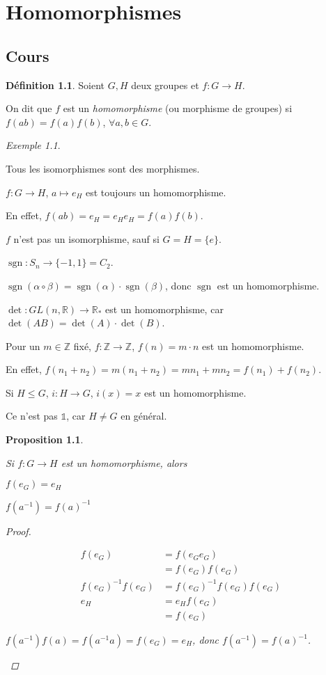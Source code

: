 \documentclass{report}
\newcounter{cours}
\newcommand*{\cours}{\section*{Cours \thecours}\stepcounter{cours}}
\newcommand*{\lte}{\leqslant}
\newcommand*{\reels}{\mathbb{R}}
\newcommand*{\entiers}{\mathbb{Z}}
\newcommand*{\identite}{\mathds{1}}
\newcommand*{\signe}{\operatorname{sgn}}
\newtheorem*{prop}{Proposition}
\theoremstyle{definition}
\newtheorem*{defin}{D\'efinition}
\theoremstyle{remark}
\newtheorem*{exem}{Exemple}
\begin{document}
	\chapter{Homomorphismes}
	\cours
	\begin{defin}
		Soient $G,H$ deux groupes et $f:G \to H$.

		On dit que $f$ est un \emph{homomorphisme} (ou morphisme de groupes) si $f(ab) = f(a)f(b)$, $\forall a,b \in G$.
	\end{defin}
	\begin{exem}~

		\begin{nlist}
			\item Tous les isomorphismes sont des morphismes.
			\item $f:G \to H$, $a \mapsto e_H$ est toujours un homomorphisme.

			En effet, $f(ab) = e_H = e_H e_H = f(a) f(b)$.

			$f$ n'est pas un isomorphisme, sauf si $G=H=\{e\}$.
			\item $\signe:S_n \to \{-1,1\} = C_2$.

			$\signe(\alpha \circ \beta) = \signe(\alpha) \cdot \signe(\beta)$, donc $\signe$ est un homomorphisme.
			\item $\det:GL(n, \reels) \to \reels_*$ est un homomorphisme, car $\det(AB) = \det(A) \cdot \det(B)$.
			\item Pour un $m \in \entiers$ fix\'e, $f:\entiers \to \entiers$, $f(n) = m \cdot n$ est un homomorphisme.

			En effet, $f(n_1+n_2) = m(n_1+n_2) = mn_1 + mn_2 = f(n_1) + f(n_2)$.
			\item Si $H \lte G$, $i:H \to G$, $i(x)=x$ est un homomorphisme.

			Ce n'est pas $\identite$, car $H \neq G$ en g\'en\'eral.
		\end{nlist}
	\end{exem}
	\begin{prop}~

		Si $f:G \to H$ est un homomorphisme, alors
		\begin{nlist}
			\item $f(e_G) = e_H$
			\item $f(a^{-1}) = f(a)^{-1}$
		\end{nlist}
		\begin{proof}~

			\begin{nlist}
				\item
				\begin{align*}
					f(e_G)&= f(e_G e_G)\\
					&= f(e_G) f(e_G)\\
					f(e_G)^{-1}f(e_G)&= f(e_G)^{-1} f(e_G) f(e_G)\\
					e_H&= e_H f(e_G)\\
					&= f(e_G)
				\end{align*}
				\item $f(a^{-1}) f(a) = f(a^{-1}a) = f(e_G) = e_H$, donc $f(a^{-1}) = f(a)^{-1}$.
			\end{nlist}
		\end{proof}
	\end{prop}
\end{document}
